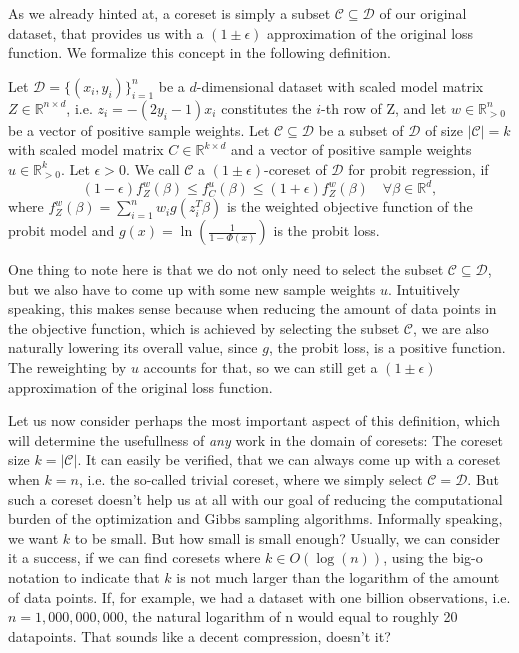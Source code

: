 As we already hinted at, a coreset is simply a subset
$\mathcal{C} \subseteq \mathcal{D}$ of our original dataset,
that provides us with a $(1 \pm \epsilon)$ approximation
of the original loss function.
We formalize this concept in the following definition.

\begin{definition}[Coreset]
    \label{def:coreset}
    Let $\mathcal{D}=\{(x_i, y_i)\}_{i=1}^n$ be a $d$-dimensional dataset
    with scaled model matrix $Z \in \mathbb{R}^{n \times d}$,
    i.e. $z_i = -(2y_i - 1)x_i$ constitutes the $i$-th
    row of Z, and let $w \in \mathbb{R}_{>0}^n$ be
    a vector of positive sample weights.
    Let $\mathcal{C} \subseteq \mathcal{D}$ be a subset of $\mathcal{D}$
    of size $|\mathcal{C}| = k$
    with scaled model matrix $C \in \mathbb{R}^{k \times d}$ and
    a vector of positive sample weights $u \in \mathbb{R}_{>0}^k$.
    Let $\epsilon > 0$.
    We call $\mathcal{C}$ a $(1 \pm \epsilon)$-coreset of $\mathcal{D}$
    for probit regression, if
    \begin{equation*}
        (1-\epsilon)f_Z^w(\beta) \leq f_C^u(\beta) \leq (1+\epsilon)f_Z^w(\beta)
        \quad \forall \beta \in \mathbb{R}^d,
    \end{equation*}
    where $f_Z^w(\beta) = \sum_{i=1}^n w_i g(z_i^T \beta)$ is the
    weighted objective function of the probit model
    and $g(x) = \ln \left( \frac{1}{1 - \Phi(x)} \right)$ is the
    probit loss.
\end{definition}

One thing to note here is that we do not only need to select the
subset $\mathcal{C} \subseteq \mathcal{D}$, but we also have to come
up with some new sample weights $u$.
Intuitively speaking, this makes sense because when reducing the
amount of data points in the objective function, which is
achieved by selecting the subset $\mathcal{C}$, we are
also naturally lowering its overall value, since $g$, the
probit loss, is a positive function. The reweighting
by $u$ accounts for that, so we can still get a $(1 \pm \epsilon)$
approximation of the original loss function.

Let us now consider perhaps the most important aspect of this definition,
which will determine the usefullness of \textit{any} work in the
domain of coresets: The coreset size $k = |\mathcal{C}|$.
It can easily be verified, that we can always come up with a coreset
when $k = n$, i.e. the so-called trivial coreset, where
we simply select $\mathcal{C} = \mathcal{D}$.
But such a coreset doesn't help us at all with our goal of reducing the
computational burden of the optimization and Gibbs sampling algorithms.
Informally speaking, we want $k$ to be small. But how small
is small enough? Usually, we can consider it a success, if we
can find coresets where $k \in O(\log(n))$, using the big-o notation
to indicate that $k$ is not much larger than the logarithm
of the amount of data points. If, for example, we had
a dataset with one billion observations, i.e. $n = 1,000,000,000$,
the natural logarithm of n would equal to roughly 20 datapoints.
That sounds like a decent compression, doesn't it?

